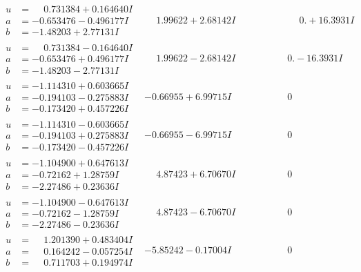 \documentclass[1p]{elsarticle_modified}
\theoremstyle{definition}
\begin{document}
$$\begin{array}{c|c|c}
\begin{aligned}
u &= \phantom{-}0.731384 + 0.164640 I \\
a &= -0.653476 - 0.496177 I \\
b &= -1.48203 + 2.77131 I\end{aligned}
 & \phantom{-}1.99622 + 2.68142 I & \phantom{-0.000000 -}0. + 16.3931 I \\ \hline\begin{aligned}
u &= \phantom{-}0.731384 - 0.164640 I \\
a &= -0.653476 + 0.496177 I \\
b &= -1.48203 - 2.77131 I\end{aligned}
 & \phantom{-}1.99622 - 2.68142 I & \phantom{-0.000000 } 0. - 16.3931 I \\ \hline\begin{aligned}
u &= -1.114310 + 0.603665 I \\
a &= -0.194103 - 0.275883 I \\
b &= -0.173420 + 0.457226 I\end{aligned}
 & -0.66955 + 6.99715 I & \phantom{-0.000000 } 0 \\ \hline\begin{aligned}
u &= -1.114310 - 0.603665 I \\
a &= -0.194103 + 0.275883 I \\
b &= -0.173420 - 0.457226 I\end{aligned}
 & -0.66955 - 6.99715 I & \phantom{-0.000000 } 0 \\ \hline\begin{aligned}
u &= -1.104900 + 0.647613 I \\
a &= -0.72162 + 1.28759 I \\
b &= -2.27486 + 0.23636 I\end{aligned}
 & \phantom{-}4.87423 + 6.70670 I & \phantom{-0.000000 } 0 \\ \hline\begin{aligned}
u &= -1.104900 - 0.647613 I \\
a &= -0.72162 - 1.28759 I \\
b &= -2.27486 - 0.23636 I\end{aligned}
 & \phantom{-}4.87423 - 6.70670 I & \phantom{-0.000000 } 0 \\ \hline\begin{aligned}
u &= \phantom{-}1.201390 + 0.483404 I \\
a &= \phantom{-}0.164242 - 0.057254 I \\
b &= \phantom{-}0.711703 + 0.194974 I\end{aligned}
 & -5.85242 - 0.17004 I & \phantom{-0.000000 } 0 \\ \hline\begin{aligned}

\end{aligned}
\end{array}$$
\end{document}
